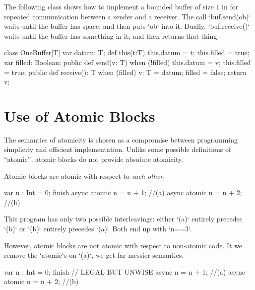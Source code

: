 \begin{example}
The following class shows how to implement a bounded buffer of size
$1$ in \Xten{} for repeated communication between a sender and a
receiver.  The call \xcd`buf.send(ob)` waits until the buffer has space, and
then puts \xcd`ob` into it.  Dually, \xcd`buf.receive()` waits until the
buffer has something in it, and then returns that thing.


\begin{xten}
class OneBuffer[T] {
  var datum: T;
  def this(t:T) { this.datum = t; this.filled = true; }
  var filled: Boolean;
  public def send(v: T) {
    when (!filled) {
      this.datum = v;
      this.filled = true;
    }
  }
  public def receive(): T {
    when (filled) {
      v: T = datum;
      filled = false;
      return v;
    }
  }
}
\end{xten}
%
\end{example}

\section{Use of Atomic Blocks}

The semantics of atomicity is chosen as a compromise between programming
simplicity and efficient implementation.  Unlike some possible definitions of
``atomic'', atomic blocks do not provide absolute atomicity.  

Atomic blocks are atomic with respect to {\em each other}.
\begin{xten}
var n : Int = 0;
finish {
  async atomic n = n + 1; //(a)
  async atomic n = n + 2; //(b)
}
\end{xten}
This program has only two possible interleavings: either \xcd`(a)` entirely
precedes \xcd`(b)` or \xcd`(b)` entirely precedes \xcd`(a)`.  Both end up with
\xcd`n==3`. 


However, atomic blocks are not atomic with respect to non-atomic code.  It we
remove the  \xcd`atomic`s on \xcd`(a)`, we get far messier semantics.
\begin{xten}
var n : Int = 0;
finish {
  // LEGAL BUT UNWISE 
  async n = n + 1;          //(a)
  async atomic n = n + 2;   //(b)
}
\end{xten}

